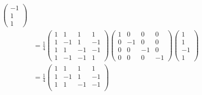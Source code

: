 \documentclass[a4paper, 10pt]{article}
\begin{document}
\begin{problem}
\begin{align*}
\begin{pmatrix}
		                                                                                                              -1 \\
		                                                                                                              1  \\
		                                                                                                              1
	                                                                                                              \end{pmatrix} \\
	              & = \frac{1}{4} \begin{pmatrix}
		                              1 & 1  & 1  & 1  \\
		                              1 & -1 & 1  & -1 \\
		                              1 & 1  & -1 & -1 \\
		                              1 & -1 & -1 & 1
	                              \end{pmatrix} \begin{pmatrix}
		                                            1 & 0  & 0  & 0  \\
		                                            0 & -1 & 0  & 0  \\
		                                            0 & 0  & -1 & 0  \\
		                                            0 & 0  & 0  & -1
	                                            \end{pmatrix} \begin{pmatrix}
		                                                          1  \\
		                                                          1  \\
		                                                          -1 \\
		                                                          1
	                                                          \end{pmatrix}                                                     \\
	              & = \frac{1}{4} \begin{pmatrix}
		                              1 & 1  & 1  & 1  \\
		                              1 & -1 & 1  & -1 \\
		                              1 & 1  & -1 & -1 \\

\end{pmatrix}
\end{align*}
\end{problem}
\end{document}
